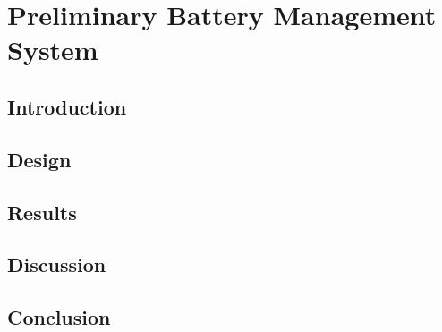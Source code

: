 \chapter{Preliminary Battery Management System}
\section{Introduction}
\section{Design}
\section{Results}
\section{Discussion}
\section{Conclusion}